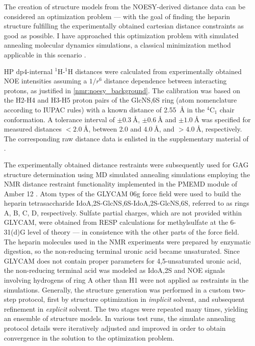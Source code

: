 The creation of structure models from the NOESY-derived distance data can be
considered an optimization problem --- with the goal of finding the heparin
structure fulfilling the experimentally obtained cartesian distance constraints
as good as possible. I have approached this optimization problem with simulated
annealing molecular dynamics simulations, a classical minimization method
applicable in this scenario \cite{nilges_sim_annealing_noe_1988}.

HP dp4-internal ${}^1$H-${}^1$H distances were calculated from experimentally
obtained NOE intensities assuming a $1/r^6$ distance dependence between
interacting protons, as justified in \cref{nmr:noesy_background}. The
calibration was based on the H2-H4 and H3-H5 proton pairs of the GlcNS,6S ring
(atom nomenclature according to IUPAC rules) with a known distance of
\SI{2.55}{\angstrom} in the ${}^4$C${}_1$ chair conformation. A tolerance
interval of $\pm \SI{0.3}{\angstrom}$, $\pm \SI{0.6}{\angstrom}$ and $\pm
\SI{1.0}{\angstrom}$ was specified for measured distances $<
\SI{2.0}{\angstrom}$, between \num{2.0} and $\SI{4.0}{\angstrom}$, and $>
\SI{4.0}{\angstrom}$, respectively. The corresponding raw distance data is
enlisted in the supplementary material of \cite{kuenze_gehrcke_2014}.

The experimentally obtained distance restraints were subsequently used for GAG
structure determination using MD simulated annealing simulations employing the
NMR distance restraint functionality implemented in the PMEMD module of Amber 12
\cite{case_amber_12}. Atom types of the GLYCAM 06g force field
\cite{kirschner_glycam06:_2008} were used to build the heparin tetrasaccharide
IdoA,2S-GlcNS,6S-IdoA,2S-GlcNS,6S, referred to as rings A, B, C, D,
respectively. Sulfate partial charges, which are not provided within GLYCAM,
were obtained from RESP calculations for methylsulfate at the 6-31(d)G level of
theory --- in consistence with the other parts of the force field. The heparin
molecules used in the NMR experiments were prepared by enzymatic digestion, so
the non-reducing terminal uronic acid became unsaturated. Since GLYCAM does not
contain proper parameters for 4,5-unsaturated uronic acid, the non-reducing
terminal acid was modeled as IdoA,2S and NOE signals involving hydrogens of ring
A other than H1 were not applied as restraints in the simulations. Generally,
the structure generation was performed in a custom two-step protocol, first by
structure optimization in \textit{implicit} solvent, and subsequent refinement
in \textit{explicit} solvent. The two stages were repeated many times, yielding
an ensemble of structure models. In various test runs, the simulate annealing
protocol details were iteratively adjusted and improved in order to obtain
convergence in the solution to the optimization problem.

